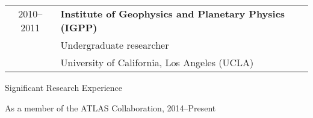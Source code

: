 \vspace{0.1in}
\hspace{0.18in}
\begin{tabular}{c|l}
    2010--2011 & {\bf{Institute of Geophysics and Planetary Physics (IGPP)}} \\
              & Undergraduate researcher \\
              & University of California, Los Angeles (UCLA) %
\end{tabular} 


\vspace{0.35in}
{\Large Significant Research Experience}\\
\HRule
\vspace{0.15in}

\hspace{0.25in}
As a member of the ATLAS Collaboration, 2014--Present

